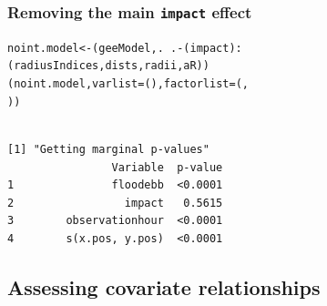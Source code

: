 \begin{frame}[fragile]
\frametitle{Removing the main {\tt impact} effect}
\begin{knitrout}\footnotesize
{}\color{fgcolor}\begin{kframe}
\begin{alltt}
noint.model<-(geeModel, .~. - (impact):
                     (radiusIndices, dists, radii, aR))
(noint.model, varlist = (), factorlist = (, 
    ))
\end{alltt}
\begin{verbatim}

[1] "Getting marginal p-values"
                Variable  p-value
1               floodebb  <0.0001
2                 impact   0.5615
3        observationhour  <0.0001
4        s(x.pos, y.pos)  <0.0001
\end{verbatim}
\end{kframe}
\end{knitrout}

\end{frame}


\subsection{Assessing covariate relationships}


